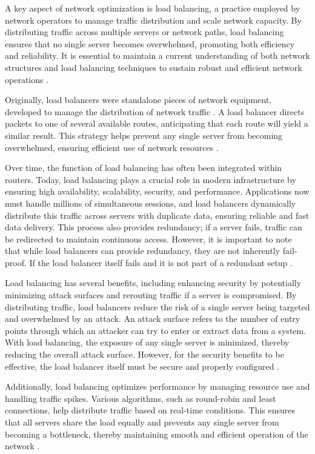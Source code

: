 \documentclass[12pt]{cwru_thesis}
\begin{document}
A key aspect of network optimization is load balancing, a practice employed by network operators to manage traffic distribution and scale network capacity. By distributing traffic across multiple servers or network paths, load balancing ensures that no single server becomes overwhelmed, promoting both efficiency and reliability. It is essential to maintain a current understanding of both network structures and load balancing techniques to sustain robust and efficient network operations  \cite{10371400}.

Originally, load balancers were standalone pieces of network equipment, developed to manage the distribution of network traffic \cite{bourke2001server}. A load balancer directs packets to one of several available routes, anticipating that each route will yield a similar result. This strategy helps prevent any single server from becoming overwhelmed, ensuring efficient use of network resources \cite{f52023loadbalancing}.

Over time, the function of load balancing has often been integrated within routers. Today, load balancing plays a crucial role in modern infrastructure by ensuring high availability, scalability, security, and performance. Applications now must handle millions of simultaneous sessions, and load balancers dynamically distribute this traffic across servers with duplicate data, ensuring reliable and fast data delivery. This process also provides redundancy; if a server fails, traffic can be redirected to maintain continuous access. However, it is important to note that while load balancers can provide redundancy, they are not inherently fail-proof. If the load balancer itself fails and it is not part of a redundant setup \cite{chang2005complex}.


Load balancing has several benefits, including enhancing security by potentially minimizing attack surfaces and rerouting traffic if a server is compromised. By distributing traffic, load balancers reduce the risk of a single server being targeted and overwhelmed by an attack. An attack surface refers to the number of entry points through which an attacker can try to enter or extract data from a system. With load balancing, the exposure of any single server is minimized, thereby reducing the overall attack surface. However, for the security benefits to be effective, the load balancer itself must be secure and properly configured  \cite{10.1145/3098593.3098595}.

Additionally, load balancing optimizes performance by managing resource use and handling traffic spikes. Various algorithms, such as round-robin and least connections, help distribute traffic based on real-time conditions. This ensures that all servers share the load equally and prevents any single server from becoming a bottleneck, thereby maintaining smooth and efficient operation of the network  \cite{8316818}.\\
\end{document}
